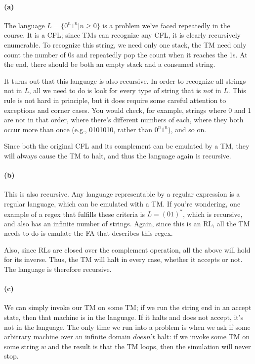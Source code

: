 \documentclass[a4paper]{article}
\begin{document}
\paragraph{(a)} The language $L = \{0^n 1^n | n \ge 0 \}$ is a problem we've faced repeatedly in the course. It is a CFL; since TMs can recognize any CFL, it is clearly recursively enumerable. To recognize this string, we need only one stack, the TM need only count the number of 0s and repeatedly pop the count when it reaches the 1s. At the end, there should be both an empty stack and a consumed string.

It turns out that this language is also recursive. In order to recognize all strings not in $L$, all we need to do is look for every type of string that is $\textit{not}$ in $L$. This rule is not hard in principle, but it does require some careful attention to exceptions and corner cases. You would check, for example, strings where 0 and 1 are not in that order, where there's different numbers of each, where they both occur more than once (e.g., 0101010, rather than $0^n 1^n$), and so on.

Since both the original CFL and its complement can be emulated by a TM, they will always cause the TM to halt, and thus the language again is recursive.

\paragraph{(b)} This is also recursive. Any language representable by a regular expression is a regular language, which can be emulated with a TM. If you're wondering, one example of a regex that fulfills these criteria is $L = (01)^*$, which is recursive, and also has an infinite number of strings. Again, since this is an RL, all the TM needs to do is emulate the FA that describes this regex.

Also, since RLs are closed over the complement operation, all the above will hold for its inverse. Thus, the TM will halt in every case, whether it accepts or not. The language is therefore recursive.

\paragraph{(c)} We can simply invoke our TM on some TM; if we run the string end in an accept state, then that machine is in the language. If it halts and does not accept, it's not in the language. The only time we run into a problem is when we ask if some arbitrary machine over an infinite domain $\textit{doesn't}$ halt: if we invoke some TM on some string $w$ and the result is that the TM loops, then the simulation will never stop.
\end{document}
